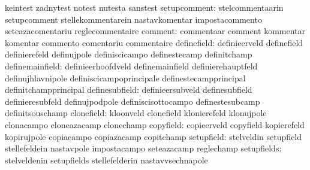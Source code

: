                                   keintest                         zadnytest
                                  notest                           nutesta
                                  sanstest
                    setupcomment: stelcommentaarin                 setupcomment
                                  stellekommentarein               nastavkomentar
                                  impostacommento                  seteazacomentariu
                                  reglecommentaire
                         comment: commentaar                       comment
                                  kommentar                        komentar
                                  commento                         comentariu
                                  commentaire
                     definefield: definieerveld                    definefield
                                  definierefeld                    definujpole
                                  definiscicampo                   definestecamp
                                  definitchamp
                 definemainfield: definieerhoofdveld               definemainfield
                                  definierehauptfeld               definujhlavnipole
                                  definiscicampoprincipale         definestecampprincipal
                                  definitchampprincipal
                  definesubfield: definieersubveld                 definesubfield
                                  definieresubfeld                 definujpodpole
                                  definiscisottocampo              definestesubcamp
                                  definitsouschamp
                      clonefield: kloonveld                        clonefield
                                  klonierefeld                     klonujpole
                                  clonacampo                       cloneazacamp
                                  clonechamp
                       copyfield: copieerveld                      copyfield
                                  kopierefeld                      kopirujpole
                                  copiacampo                       copiazacamp
                                  copitchamp
                      setupfield: stelveldin                       setupfield
                                  stellefeldein                    nastavpole
                                  impostacampo                     seteazacamp
                                  reglechamp
                     setupfields: stelveldenin                     setupfields
                                  stellefelderin                   nastavvsechnapole
